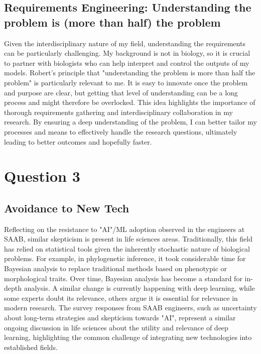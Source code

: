 \documentclass{article}
\begin{document}
\subsection{Requirements Engineering: Understanding the problem is (more than half) the problem}
Given the interdisciplinary nature of my field, understanding the requirements can be particularly challenging. My background is not in biology, so it is crucial to partner with biologists who can help interpret and control the outputs of my models. Robert's principle that "understanding the problem is more than half the problem" is particularly relevant to me. It is easy to innovate once the problem and purpose are clear, but getting that level of understanding can be a long process and might therefore be overlocked. This idea highlights the importance of thorough requirements gathering and interdisciplinary collaboration in my research. By ensuring a deep understanding of the problem, I can better tailor my processes and means to effectively handle the research questions, ultimately leading to better outcomes and hopefully faster.

\section{Question 3}
\subsection{Avoidance to New Tech}
Reflecting on the resistance to "AI"/ML adoption observed in the engineers at SAAB, similar skepticism is present in life sciences areas. Traditionally, this field has relied on statistical tools given the inherently stochastic nature of biological problems. For example, in phylogenetic inference, it took considerable time for Bayesian analysis to replace traditional methods based on phenotypic or morphological traits. Over time, Bayesian analysis has become a standard for in-depth analysis. A similar change is currently happening with deep learning, while some experts doubt its relevance, others argue it is essential for relevance in modern research. The survey responses from SAAB engineers, such as uncertainty about long-term strategies and skepticism towards "AI", represent a similar ongoing discussion in life sciences about the utility and relevance of deep learning, highlighting the common challenge of integrating new technologies into established fields.
\end{document}
